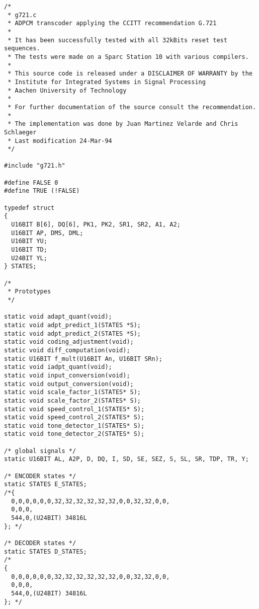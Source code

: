 \begin{verbatim}
/*
 * g721.c
 * ADPCM transcoder applying the CCITT recommendation G.721
 *
 * It has been successfully tested with all 32kBits reset test sequences.
 * The tests were made on a Sparc Station 10 with various compilers.
 *
 * This source code is released under a DISCLAIMER OF WARRANTY by the
 * Institute for Integrated Systems in Signal Processing
 * Aachen University of Technology
 *
 * For further documentation of the source consult the recommendation.
 *
 * The implementation was done by Juan Martinez Velarde and Chris Schlaeger
 * Last modification 24-Mar-94
 */

#include "g721.h"

#define FALSE 0
#define TRUE (!FALSE)

typedef struct
{
  U16BIT B[6], DQ[6], PK1, PK2, SR1, SR2, A1, A2;
  U16BIT AP, DMS, DML;
  U16BIT YU;
  U16BIT TD;
  U24BIT YL;
} STATES;

/*
 * Prototypes
 */

static void adapt_quant(void);
static void adpt_predict_1(STATES *S);
static void adpt_predict_2(STATES *S);
static void coding_adjustment(void);
static void diff_computation(void);
static U16BIT f_mult(U16BIT An, U16BIT SRn);
static void iadpt_quant(void);
static void input_conversion(void);
static void output_conversion(void);
static void scale_factor_1(STATES* S);
static void scale_factor_2(STATES* S);
static void speed_control_1(STATES* S);
static void speed_control_2(STATES* S);
static void tone_detector_1(STATES* S);
static void tone_detector_2(STATES* S);

/* global signals */
static U16BIT AL, A2P, D, DQ, I, SD, SE, SEZ, S, SL, SR, TDP, TR, Y;

/* ENCODER states */
static STATES E_STATES;
/*{
  0,0,0,0,0,0,32,32,32,32,32,32,0,0,32,32,0,0,
  0,0,0,
  544,0,(U24BIT) 34816L
}; */

/* DECODER states */
static STATES D_STATES;
/*
{
  0,0,0,0,0,0,32,32,32,32,32,32,0,0,32,32,0,0,
  0,0,0,
  544,0,(U24BIT) 34816L
}; */


\end{verbatim}
